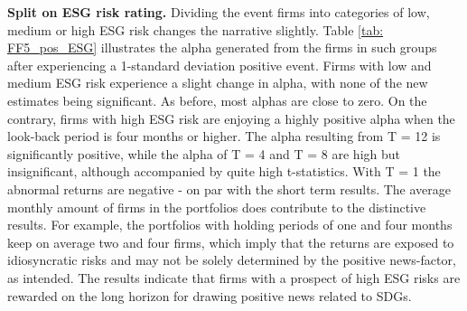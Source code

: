 \textbf{Split on ESG risk rating.}
Dividing the event firms into categories of low, medium or high ESG risk changes the narrative slightly. Table \ref{tab: FF5_pos_ESG} illustrates the alpha generated from the firms in such groups after experiencing a 1-standard deviation positive event. Firms with low and medium ESG risk experience a slight change in alpha, with none of the new estimates being significant. As before, most alphas are close to zero. On the contrary, firms with high ESG risk are enjoying a highly positive alpha when the look-back period is four months or higher. The alpha resulting from T = 12 is significantly positive, while the alpha of T = 4 and T = 8 are high but insignificant, although accompanied by quite high t-statistics. With T = 1 the abnormal returns are negative - on par with the short term results. 
The average monthly amount of firms in the portfolios does contribute to the distinctive results. For example, the portfolios with holding periods of one and four months keep on average two and four firms, which imply that the returns are exposed to idiosyncratic risks and may not be solely determined by the positive news-factor, as intended. The results indicate that firms with a prospect of high ESG risks are rewarded on the long horizon for drawing positive news related to SDGs.


